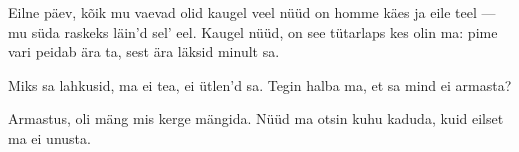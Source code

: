 Eilne p\"aev, k\~oik mu vaevad olid kaugel veel
n\"u\"ud on homme k\"aes ja eile teel ---
mu s\"uda raskeks l\"ain'd sel' eel.
Kaugel n\"u\"ud, on see t\"utarlaps kes olin ma:
pime vari peidab \"ara ta,
sest \"ara l\"aksid minult sa.

Miks sa lahkusid, ma ei tea, ei \"utlen'd sa.
Tegin halba ma, et sa mind ei armasta?

Armastus, oli m\"ang mis kerge m\"angida.
N\"u\"ud ma otsin kuhu kaduda,
kuid eilset ma ei unusta.